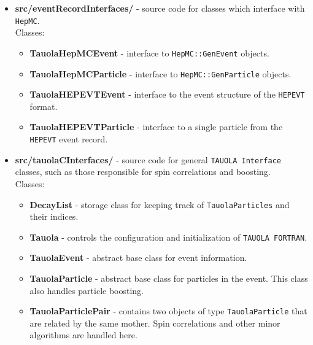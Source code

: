 \documentclass[]{Tauola_interface_design}
\begin{document}
\begin{itemize}
\item {\bf src/eventRecordInterfaces/ } - source code for classes which interface with {\tt HepMC}.\\
  Classes:
  \begin{itemize}
  \item { \bf TauolaHepMCEvent} - interface to {\tt HepMC::GenEvent} objects. 
  \item { \bf TauolaHepMCParticle} - interface to {\tt HepMC::GenParticle} objects. 
  \item { \bf TauolaHEPEVTEvent} - interface to the event structure of the {\tt HEPEVT} format. 
  \item { \bf TauolaHEPEVTParticle} - interface to a single particle from the {\tt HEPEVT} event record.
  \end{itemize}   

\item {\bf src/tauolaCInterfaces/ } - source code for general {\tt TAUOLA Interface} classes, such as those
  responsible for spin correlations and boosting.  \\
  Classes:
  \begin{itemize}
  \item { \bf DecayList } - storage class for keeping track of {\tt TauolaParticles} and their indices.
  \item { \bf Tauola } - controls the configuration and initialization of {\tt TAUOLA FORTRAN}.
  \item { \bf TauolaEvent } - abstract base class for event information.
  \item { \bf TauolaParticle } - abstract base class for particles in the event. This class also handles particle boosting. 
  \item { \bf TauolaParticlePair } - contains two objects of type {\tt TauolaParticle} that are related by the same mother. Spin correlations and other minor algorithms are handled here. 
  \end{itemize}


\end{itemize}
\end{document}
